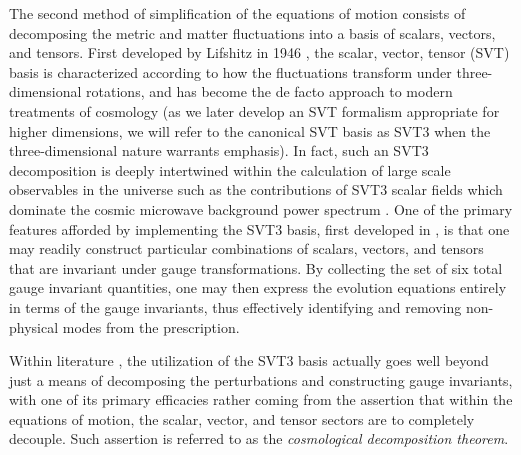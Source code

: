 The second method of simplification of the equations of motion consists of decomposing the metric and matter fluctuations into a basis of scalars, vectors, and tensors. First developed by Lifshitz in 1946 \cite{lifshitz_2017}, the scalar, vector, tensor (SVT) basis is characterized according to how the fluctuations transform under three-dimensional rotations, and has become the de facto approach to modern treatments of cosmology \cite{bardeen_1980, bertschinger_2000, ellis_maartens_maccallum_2009, mukhanov_1992, york_1973, weinberg_2008} (as we later develop an SVT formalism appropriate for higher dimensions, we will refer to the canonical SVT basis as SVT3 when the three-dimensional nature warrants emphasis). In fact, such an SVT3 decomposition is deeply intertwined within the calculation of large scale observables in the universe such as the contributions of SVT3 scalar fields which dominate the cosmic microwave background power spectrum \cite{hu_dodelson_2002, weinberg_2008}. One of the primary features afforded by implementing the SVT3 basis, first developed in \cite{bardeen_1980}, is that one may readily construct particular combinations of scalars, vectors, and tensors that are invariant under gauge transformations. By collecting the set of six total gauge invariant quantities, one may then express the evolution equations entirely in terms of the gauge invariants, thus effectively identifying and removing non-physical modes from the prescription. 

Within literature \cite{kodama_sasaki_1984, bardeen_1980, ellis_maartens_maccallum_2009}, the utilization of the SVT3 basis actually goes well beyond just a means of decomposing the perturbations and constructing gauge invariants, with one of its primary efficacies rather coming from the assertion that within the equations of motion, the scalar, vector, and tensor sectors are to completely decouple. Such assertion is referred to as the \emph{cosmological decomposition theorem}.

